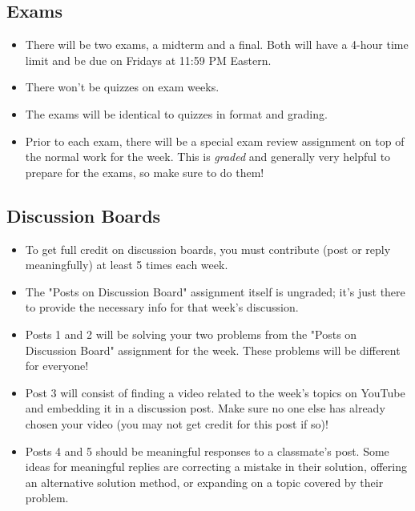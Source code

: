 \documentclass[11pt]{exam}
\begin{document}
    \vspace{10px}
    \subsection{Exams}
    \begin{itemize}
        \item There will be two exams, a midterm and a final. Both will have a 4-hour time limit and be due on Fridays at 11:59 PM Eastern.
        \item There won't be quizzes on exam weeks.
        \item The exams will be identical to quizzes in format and grading.
        \item Prior to each exam, there will be a special exam review assignment on top of the normal work for the week. This is \textit{graded} and
        generally very helpful to prepare for the exams, so make sure to do them!
    \end{itemize}
    
    \vspace{10px}
    \subsection{Discussion Boards}
    \begin{itemize}
        \item To get full credit on discussion boards, you must contribute (post or reply meaningfully) at least 5 times each week.
        \item The "Posts on Discussion Board" assignment itself is ungraded; it's just there to provide the necessary info for that week's discussion.
        \item Posts 1 and 2 will be solving your two problems from the "Posts on Discussion Board" assignment for the week. These problems will be 
        different for everyone!
        \item Post 3 will consist of finding a video related to the week's topics on YouTube and embedding it in a discussion post. Make sure no one else
        has already chosen your video (you may not get credit for this post if so)!
        \item Posts 4 and 5 should be meaningful responses to a classmate's post. Some ideas for meaningful replies are correcting a mistake in their
        solution, offering an alternative solution method, or expanding on a topic covered by their problem.
    \end{itemize}
\end{document}
